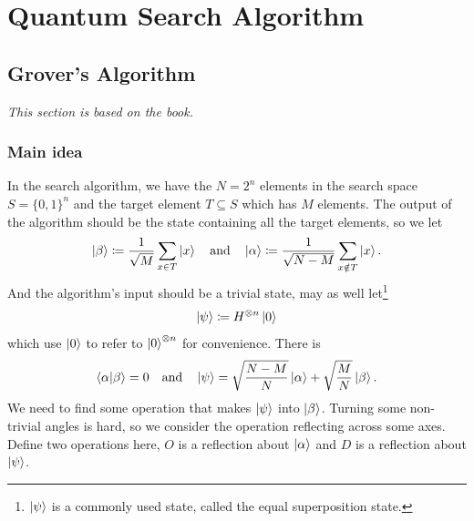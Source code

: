 \documentclass[a4paper,10pt]{book}
\numberwithin{equation}{section}
\begin{document}
\chapter{Quantum Search Algorithm}

\section{Grover's Algorithm}

\textit{This section is based on the book\cite{nielsen2010}.}

\subsection{\label{subsec:GroverMainIdea}Main idea}

In the search algorithm, we have the $N=2^{n}$ elements in the search space $S=\{0,1\}^{n}$ and the target element $T\subseteq S$ which has $M$ elements. The output of the algorithm should be the state containing all the target elements, so we let
\begin{equation}
    \ket{\beta}\coloneqq\frac{1}{\sqrt{M}}\sum_{x\in T}\ket{x}
    \quad\text{and}\quad
    \ket{\alpha}\coloneqq\frac{1}{\sqrt{N-M}}\sum_{x\notin T}\ket{x}.
\end{equation}
And the algorithm's input should be a trivial state, may as well let\footnote{$\ket{\psi}$ is a commonly used state, called the equal superposition state.}
\begin{equation}
    \ket{\psi}\coloneqq H^{\otimes n}\ket{0}
\end{equation}
which use $\ket{0}$ to refer to $\ket{0}^{\otimes n}$ for convenience. There is
\begin{equation}
    \braket{\alpha|\beta}=0
    \quad\text{and}\quad
    \ket{\psi}=\sqrt{\frac{N-M}{N}}\ket{\alpha}+\sqrt{\frac{M}{N}}\ket{\beta}.
\end{equation}
We need to find some operation that makes $\ket{\psi}$ into $\ket{\beta}$. Turning some non-trivial angles is hard, so we consider the operation reflecting across some axes. Define two operations here, $O$ is a reflection about $\ket{\alpha}$ and $D$ is a reflection about $\ket{\psi}$.
\end{document}
